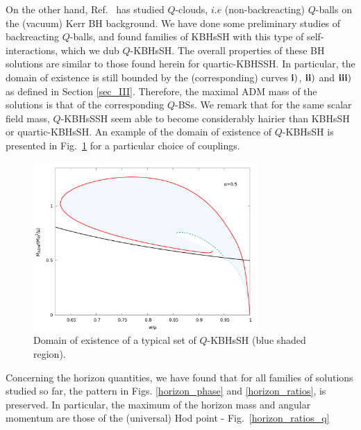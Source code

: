 On the other hand, Ref.~\cite{Herdeiro:2014pka} has studied $Q$-clouds, $i.e$ (non-backreacting) $Q$-balls on the (vacuum) Kerr BH background. We have done some preliminary studies of backreacting $Q$-balls, and found families of KBHsSH with this type of self-interactions, which we dub $Q$-KBHsSH. The overall properties of these BH solutions are similar to those found herein for  quartic-KBHSSH.
In particular, the domain of existence is still bounded by the (corresponding)
curves ${\bf i)}$, ${\bf ii)}$ and ${\bf iii)}$ as defined in Section \ref{sec_III}. 
Therefore, the maximal ADM mass 
of the solutions is 
that of the corresponding $Q$-BSs.
We remark that for the same scalar field mass, $Q$-KBHsSSH seem able to become considerably hairier than KBHsSH or quartic-KBHsSH.
%
An example of the domain of existence of $Q$-KBHsSH is presented in Fig.~\ref{qkbhsh} for a particular choice of couplings.
%
\begin{figure}[h!]
  \begin{center}
     \includegraphics[width=8.55cm]{papers/selfInteractions/w-vs-M-Q-a=05.png}
      \end{center}
  \caption{Domain of existence of a typical set of $Q$-KBHsSH (blue shaded region).}
  \label{qkbhsh}
\end{figure}
%


Concerning the horizon quantities, we have found
that for all families of solutions studied so far,
 the pattern in 
Figs. \ref{horizon_phase} and \ref{horizon_ratios},   
is preserved.
In particular, the maximum of the horizon mass and angular momentum
are those of the (universal) Hod point - Fig.~\ref{horizon_ratios_q}

